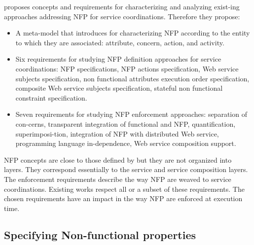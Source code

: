 \cite{ScCM10} proposes concepts and requirements for characterizing and analyzing exist-ing approaches addressing NFP for service coordinations. Therefore they propose:
\begin{itemize}
\item	A meta-model that introduces for characterizing NFP according to the entity to which they are associated: attribute, concern, action, and activity. 
\item	Six requirements for studying NFP definition approaches for service coordinations: NFP specifications, NFP actions specification, Web service subjects specification, non functional attributes execution order specification, composite Web service subjects specification, stateful non functional constraint specification.
\item	Seven requirements for studying NFP enforcement approaches: separation of con-cerns, transparent integration of functional and NFP, quantification, superimposi-tion, integration of NFP with distributed Web service, programming language in-dependence, Web service composition support.
\end{itemize}

NFP concepts are close to those defined by \cite{Souz12} but they are not organized into layers.  They correspond essentially to the service and service composition layers. The enforcement requirements describe the way NFP are weaved to service coordinations. Existing works respect all or a subset of these requirements. The chosen requirements have an impact in the way NFP are enforced at execution time.



\subsection{Specifying Non-functional properties}

